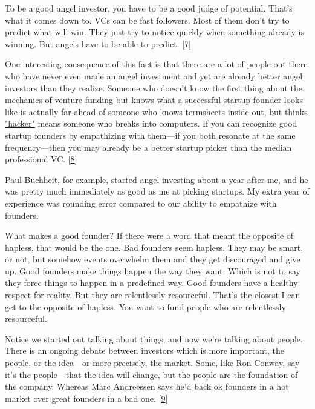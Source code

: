 To be a good angel investor, you have
                  to be a good judge of potential. That's what it comes down to.
                  VCs can be fast followers. Most of them don't try to predict
                  what will win. They just try to notice quickly when something
                  already is winning. But angels have to be able to predict.
                  [\href{\#f7n}{7}]

One interesting consequence of this fact is that
                  there are a lot of people out there who have never even made
                  an angel investment and yet are already better angel investors
                  than they realize. Someone who doesn't know the first thing
                  about the mechanics of venture funding but knows what a
                  successful startup founder looks like is actually far ahead of
                  someone who knows termsheets inside out, but thinks
                  \href{http://www.paulgraham.com/gba.html}{"hacker"} means someone who breaks into
                  computers. If you can recognize good startup founders by
                  empathizing with them---if you both resonate at the same
                  frequency---then you may already be a better startup
                  picker than the median professional VC.
                  [\href{\#f8n}{8}]

Paul Buchheit, for example, started angel
                  investing about a year after me, and he was pretty much
                  immediately as good as me at picking startups. My extra year
                  of experience was rounding error compared to our ability to
                  empathize with founders.

What makes a good founder?
                  If there were a word that meant the opposite of hapless, that
                  would be the one. Bad founders seem hapless. They may be
                  smart, or not, but somehow events overwhelm them and they get
                  discouraged and give up. Good founders make things happen the
                  way they want. Which is not to say they force things to happen
                  in a predefined way. Good founders have a healthy respect for
                  reality. But they are relentlessly resourceful. That's the
                  closest I can get to the opposite of hapless. You want to fund
                  people who are relentlessly resourceful.

Notice we
                  started out talking about things, and now we're talking about
                  people. There is an ongoing debate between investors which is
                  more important, the people, or the idea---or more
                  precisely, the market. Some, like Ron Conway, say it's the
                  people---that the idea will change, but the people are the
                  foundation of the company. Whereas Marc Andreessen says he'd
                  back ok founders in a hot market over great founders in a bad
                  one.
                  [\href{\#f9n}{9}]

